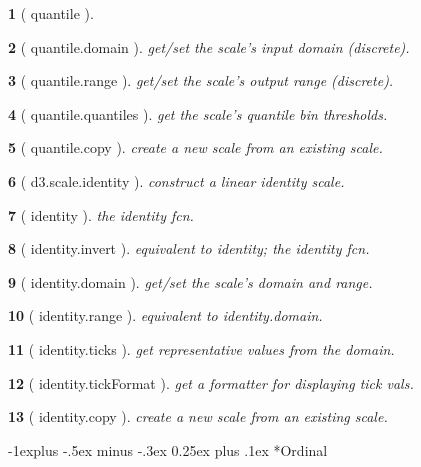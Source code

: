 \documentclass[10pt,landscape,letterpaper]{article}
\makeatletter
\newcounter{thm}
\newcommand{\hdrule}{\vspace{-4pt} \hdashrule[0.25ex]{\fill}{.5pt}{1pt}\vspace{-4pt}}
\theoremstyle{mytheoremstyle}
\newtheorem*{thm}{}
\renewcommand{\subsection}{\@startsection{subsection}{2}{0mm}%
                                {-1explus -.5ex minus -.3ex}%
                                {0.25ex plus .1ex}%
                                {\normalfont\normalsize\bfseries}}
\makeatother
\begin{document}
\begin{multicols}{3}
\begin{thm} [ quantile ]
\end{thm}\begin{thm} [ quantile.domain ]  get/set the scale's input domain (discrete).
\end{thm}\begin{thm} [ quantile.range ]  get/set the scale's output range (discrete).
\end{thm}\begin{thm} [ quantile.quantiles ]  get the scale's quantile bin thresholds.
\end{thm}\begin{thm} [ quantile.copy ]  create a new scale from an existing scale.
\end{thm}\begin{thm} [ d3.scale.identity ]  construct a linear identity scale.
\end{thm}\begin{thm} [ identity ]  the identity fcn.
\end{thm}\begin{thm} [ identity.invert ]  equivalent to identity; the identity fcn.
\end{thm}\begin{thm} [ identity.domain ]  get/set the scale's domain and range.
\end{thm}\begin{thm} [ identity.range ]  equivalent to identity.domain.
\end{thm}\begin{thm} [ identity.ticks ]  get representative values from the domain.
\end{thm}\begin{thm} [ identity.tickFormat ]  get a formatter for displaying tick vals.
\end{thm}\begin{thm} [ identity.copy ]  create a new scale from an existing scale.
\end{thm}
\hdrule
\subsection*{Ordinal}


\end{multicols}
\end{document}
